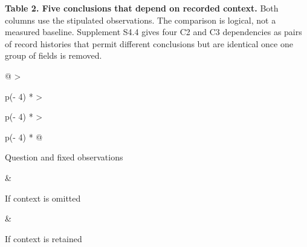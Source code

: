 \documentclass[
  11pt,
]{article}
\begin{document}
\suppressfloats[t]
\begin{table}[!ht]
\textbf{Table 2. Five conclusions that depend on recorded context.} Both
columns use the stipulated observations. The comparison is logical, not
a measured baseline. Supplement S4.4 gives four C2 and C3 dependencies
as pairs of record histories that permit different conclusions but are
identical once one group of fields is removed.\par\smallskip
{\small
\begin{tabular}{@{}
  >{\raggedright\arraybackslash}p{(\columnwidth - 4\tabcolsep) * }
  >{\raggedright\arraybackslash}p{(\columnwidth - 4\tabcolsep) * }
  >{\raggedright\arraybackslash}p{(\columnwidth - 4\tabcolsep) * }@{}}
\toprule\noalign{}
\begin{minipage}[b]{\linewidth}\raggedright
Question and fixed observations
\end{minipage} & \begin{minipage}[b]{\linewidth}\raggedright
If context is omitted
\end{minipage} & \begin{minipage}[b]{\linewidth}\raggedright
If context is retained
\end{minipage} \\
\midrule\noalign{}


\end{tabular}}
\end{table}
\end{document}
